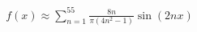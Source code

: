 \documentclass[preview]{standalone}
\begin{document}
\begin{align*}
f(x) \approx \sum_{n=1}^{55} \frac{8n}{\pi(4n^2-1)} \sin(2nx)
\end{align*}
\end{document}
